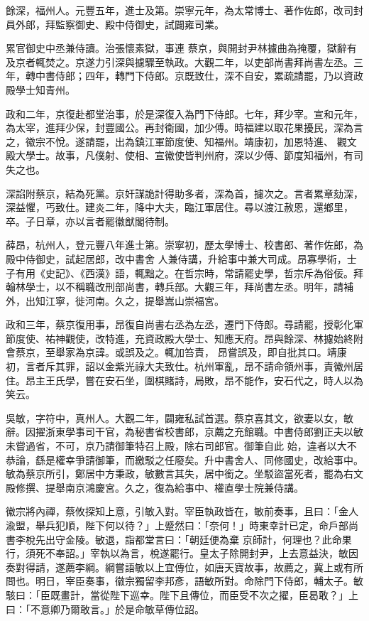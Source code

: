 \begin{pinyinscope}
 餘深，福州人。元豐五年，進士及第。崇寧元年，為太常博士、著作佐郎，改司封員外郎，拜監察御史、殿中侍御史，試闢雍司業。



 累官御史中丞兼侍讀。治張懷素獄，事連
 蔡京，與開封尹林攄曲為掩覆，獄辭有及京者輒焚之。京遂力引深與攄驟至執政。大觀二年，以吏部尚書拜尚書左丞。三年，轉中書侍郎；四年，轉門下侍郎。京既致仕，深不自安，累疏請罷，乃以資政殿學士知青州。



 政和二年，京復赴都堂治事，於是深復入為門下侍郎。七年，拜少宰。宣和元年，為太宰，進拜少保，封豐國公。再封衛國，加少傅。時福建以取花果擾民，深為言之，徽宗不悅。遂請罷，出為鎮江軍節度使、知福州。靖康初，加恩特進、
 觀文殿大學士。故事，凡僕射、使相、宣徽使皆判州府，深以少傅、節度知福州，有司失之也。



 深諂附蔡京，結為死黨。京奸謀詭計得助多者，深為首，攄次之。言者累章劾深，深益懼，丐致仕。建炎二年，降中大夫，臨江軍居住。尋以渡江赦恩，還鄉里，卒。子日章，亦以言者罷徽猷閣待制。



 薛昂，杭州人，登元豐八年進士第。崇寧初，歷太學博士、校書郎、著作佐郎，為殿中侍御史，試起居郎，改中書舍
 人兼侍講，升給事中兼大司成。昂寡學術，士子有用《史記》、《西漢》語，輒黜之。在哲宗時，常請罷史學，哲宗斥為俗佞。拜翰林學士，以不稱職改刑部尚書，轉兵部。大觀三年，拜尚書左丞。明年，請補外，出知江寧，徙河南。久之，提舉嵩山崇福宮。



 政和三年，蔡京復用事，昂復自尚書右丞為左丞，遷門下侍郎。尋請罷，授彰化軍節度使、祐神觀使，改特進，充資政殿大學士、知應天府。昂與餘深、林攄始終附會蔡京，至舉家為京諱。或誤及之。輒加笞責，
 昂嘗誤及，即自批其口。靖康初，言者斥其罪，詔以金紫光祿大夫致仕。杭州軍亂，昂不請命領州事，責徽州居住。昂主王氏學，嘗在安石坐，圍棋賭詩，局敗，昂不能作，安石代之，時人以為笑云。



 吳敏，字符中，真州人。大觀二年，闢雍私試首選。蔡京喜其文，欲妻以女，敏辭。因擢浙東學事司干官，為秘書省校書郎，京薦之充館職。中書侍郎劉正夫以敏未嘗過省，不可，京乃請御筆特召上殿，除右司郎官。御筆自此
 始，違者以大不恭論，繇是權幸爭請御筆，而繳駁之任廢矣。升中書舍人、同修國史，改給事中。敏為蔡京所引，鄭居中方秉政，敏數言其失，居中銜之。坐駁盜當死者，罷為右文殿修撰、提舉南京鴻慶宮。久之，復為給事中、權直學士院兼侍講。



 徽宗將內禪，蔡攸探知上意，引敏入對。宰臣執政皆在，敏前奏事，且曰：「金人渝盟，舉兵犯順，陛下何以待？」上蹙然曰：「奈何！」時東幸計已定，命戶部尚書李梲先出守金陵。敏退，詣都堂言曰：「朝廷便為棄
 京師計，何理也？此命果行，須死不奉詔。」宰執以為言，梲遂罷行。皇太子除開封尹，上去意益決，敏因奏對得請，遂薦李綱。綱嘗語敏以上宜傳位，如唐天寶故事，故薦之，冀上或有所問也。明日，宰臣奏事，徽宗獨留李邦彥，語敏所對。命除門下侍郎，輔太子。敏駭曰：「臣既畫計，當從陛下巡幸。陛下且傳位，而臣受不次之擢，臣曷敢？」上曰：「不意卿乃爾敢言。」於是命敏草傳位詔。




\end{pinyinscope}
